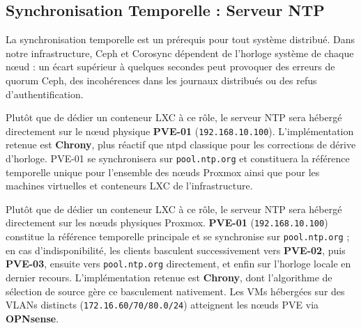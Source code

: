 \subsection{Synchronisation Temporelle : Serveur NTP}

\par La synchronisation temporelle est un prérequis pour tout système distribué. Dans notre infrastructure, Ceph et Corosync dépendent de l'horloge système de chaque nœud : un écart supérieur à quelques secondes peut provoquer des erreurs de quorum Ceph, des incohérences dans les journaux distribués ou des refus d'authentification. \\

\par Plutôt que de dédier un conteneur LXC à ce rôle, le serveur NTP sera hébergé directement sur le nœud physique \textbf{PVE-01} (\texttt{192.168.10.100}). L'implémentation retenue est \textbf{Chrony}, plus réactif que ntpd classique pour les corrections de dérive d'horloge. PVE-01 se synchronisera sur \texttt{pool.ntp.org} et constituera la référence temporelle unique pour l'ensemble des nœuds Proxmox ainsi que pour les machines virtuelles et conteneurs LXC de l'infrastructure. \\

\par Plutôt que de dédier un conteneur LXC à ce rôle, le serveur NTP sera hébergé directement  sur les nœuds physiques Proxmox. \textbf{PVE-01} (\texttt{192.168.10.100}) constitue la référence  temporelle principale et se synchronise sur \texttt{pool.ntp.org} ; en cas d'indisponibilité,  les clients basculent successivement vers \textbf{PVE-02}, puis \textbf{PVE-03}, ensuite vers  \texttt{pool.ntp.org} directement, et enfin sur l'horloge locale en dernier recours.  L'implémentation retenue est \textbf{Chrony}, dont l'algorithme de sélection de source gère  ce basculement nativement. Les VMs hébergées sur des VLANs distincts  (\texttt{172.16.60/70/80.0/24}) atteignent les nœuds PVE via \textbf{OPNsense}.\\

